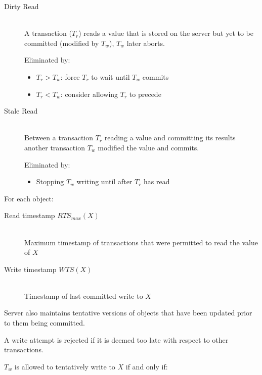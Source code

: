 \documentclass[a4paper]{article}
\begin{document}

\begin{description}
  \item[Dirty Read] \hfill \\
    A transaction ($T_{r}$) reads a value that is stored on the server but yet
    to be committed (modified by $T_{w}$), $T_{w}$ later aborts.

    Eliminated by:

    \begin{itemize}
      \item $T_{r} > T_{w}$: force $T_{r}$ to wait until $T_{w}$ commits
      \item $T_{r} < T_{w}$: consider allowing $T_{r}$ to precede
    \end{itemize}

  \item[Stale Read] \hfill \\
    Between a transaction $T_{r}$ reading a value and committing its results
    another transaction $T_{w}$ modified the value and commits.

    Eliminated by:

    \begin{itemize}
      \item Stopping $T_{w}$ writing until after $T_{r}$ has read
    \end{itemize}

\end{description}


For each object:

\begin{description}
  \item[Read timestamp $RTS_{max}(X)$] \hfill \\
    Maximum timestamp of transactions that were permitted to read the value of
    $X$
  \item[Write timestamp $WTS(X)$] \hfill \\
    Timestamp of last committed write to $X$
\end{description}

Server also maintains tentative versions of objects that have been updated prior
to them being committed.


A write attempt is rejected if it is deemed too late with respect to other
transactions.

$T_{w}$ is allowed to tentatively write to $X$ if and only if:
\end{document}
